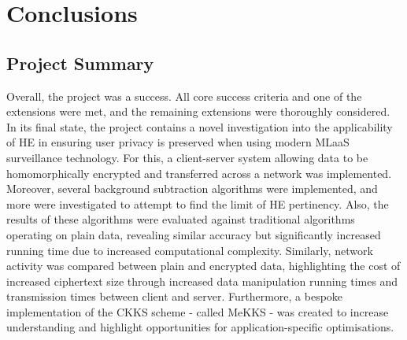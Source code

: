 \chapter{Conclusions}
\label{chap:conclusions}

\section{Project Summary}
\indent \indent
Overall, the project was a success. All core success criteria and one of the extensions were met, and the remaining extensions were thoroughly considered. In its final state, the project contains a novel investigation into the applicability of HE in ensuring user privacy is preserved when using modern MLaaS surveillance technology. For this, a client-server system allowing data to be homomorphically encrypted and transferred across a network was implemented. Moreover, several background subtraction algorithms were implemented, and more were investigated to attempt to find the limit of HE pertinency. Also, the results of these algorithms were evaluated against traditional algorithms operating on plain data, revealing similar accuracy but significantly increased running time due to increased computational complexity. Similarly, network activity was compared between plain and encrypted data, highlighting the cost of increased ciphertext size through increased data manipulation running times and transmission times between client and server.   Furthermore, a bespoke implementation of the CKKS scheme - called MeKKS - was created to increase understanding and highlight opportunities for application-specific optimisations.







